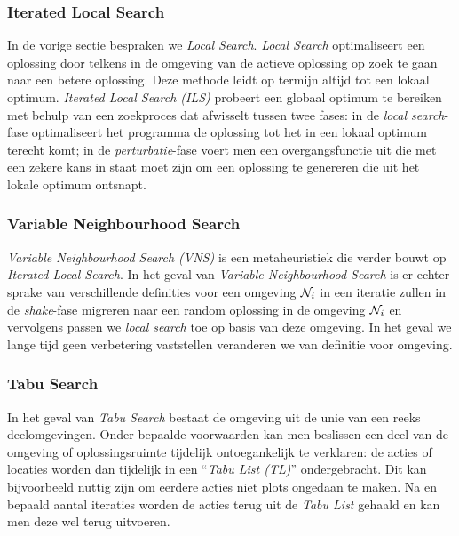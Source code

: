 \subsubsection{Iterated Local Search}

In de vorige sectie bespraken we \emph{Local Search}. \emph{Local Search} optimaliseert een oplossing door telkens in de omgeving van de actieve oplossing op zoek te gaan naar een betere oplossing. Deze methode leidt op termijn altijd tot een lokaal optimum. \emph{Iterated Local Search (ILS)} probeert een globaal optimum te bereiken met behulp van een zoekproces dat afwisselt tussen twee fases: in de \emph{local search}-fase optimaliseert het programma de oplossing tot het in een lokaal optimum terecht komt; in de \emph{perturbatie}-fase voert men een overgangsfunctie uit die met een zekere kans in staat moet zijn om een oplossing te genereren die uit het lokale optimum ontsnapt.\cite{stuetzle:1999,Glover2003}

\subsubsection{Variable Neighbourhood Search}

\emph{Variable Neighbourhood Search (VNS)} is een metaheuristiek die verder bouwt op \emph{Iterated Local Search}. In het geval van \emph{Variable Neighbourhood Search} is er echter sprake van verschillende definities voor een omgeving $\mathcal{N}_i$ in een iteratie zullen in de \emph{shake}-fase migreren naar een random oplossing in de omgeving $\mathcal{N}_i$ en vervolgens passen we \emph{local search} toe op basis van deze omgeving. In het geval we lange tijd geen verbetering vaststellen veranderen we van definitie voor omgeving.\cite{journals/eor/HansenM01}

\subsubsection{Tabu Search}
In het geval van \emph{Tabu Search} bestaat de omgeving uit de unie van een reeks deelomgevingen. Onder bepaalde voorwaarden kan men beslissen een deel van de omgeving of oplossingsruimte tijdelijk ontoegankelijk te verklaren: de acties of locaties worden dan tijdelijk in een ``\emph{Tabu List (TL)}'' ondergebracht. Dit kan bijvoorbeeld nuttig zijn om eerdere acties niet plots ongedaan te maken. Na en bepaald aantal iteraties worden de acties terug uit de \emph{Tabu List} gehaald en kan men deze wel terug uitvoeren.\cite{journals/cor/Glover86,DBLP:journals/informs/Glover89,citeulike:2634743,Glover:TabuSearch}

